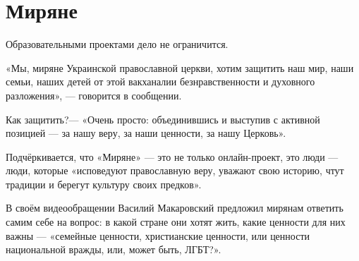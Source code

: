  
 
 
 
 
\chapter{Миряне}
\label{sec:slova.mirjane}

Образовательными проектами дело не ограничится.

«Мы, миряне Украинской православной церкви, хотим защитить наш мир, наши семьи, наших детей от этой вакханалии безнравственности и духовного разложения», — говорится в сообщении.

Как защитить?— «Очень просто: объединившись и выступив с активной позицией — за нашу веру, за наши ценности, за нашу Церковь».

Подчёркивается, что «Миряне» — это не только онлайн-проект, это люди — люди, которые «исповедуют православную веру, уважают свою историю, чтут традиции и берегут культуру своих предков».

В своём видеообращении Василий Макаровский предложил мирянам ответить самим себе на вопрос: в какой стране они хотят жить, какие ценности для них важны — «семейные ценности, христианские ценности, или ценности национальной вражды, или, может быть, ЛГБТ?».

